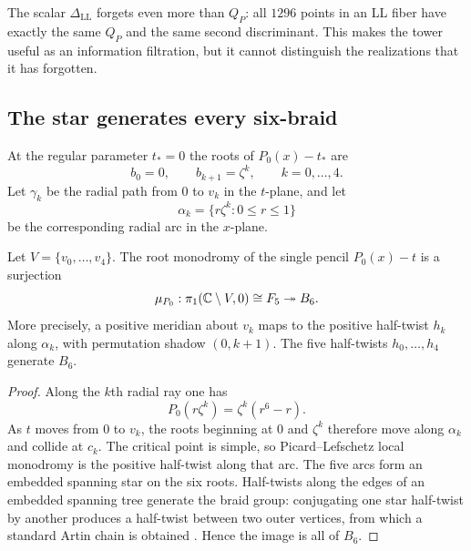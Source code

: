The scalar $\Delta_{\mathrm{LL}}$ forgets even more than $Q_P$: all $1296$
points in an LL fiber have exactly the same $Q_P$ and the same second
discriminant.  This makes the tower useful as an information filtration, but
it cannot distinguish the realizations that it has forgotten.

\subsection{The star generates every six-braid}

At the regular parameter $t_*=0$ the roots of $P_0(x)-t_*$ are
\begin{equation}
 b_0=0,
 \qquad
 b_{k+1}=\zeta^k,
 \qquad k=0,\ldots,4.
 \label{eq:sextic-base-root-labels}
\end{equation}
Let $\gamma_k$ be the radial path from $0$ to $v_k$ in the $t$-plane, and let
\begin{equation}
 \alpha_k=\{r\zeta^k:0\le r\le1\}
 \label{eq:sextic-star-vanishing-arcs}
\end{equation}
be the corresponding radial arc in the $x$-plane.

\begin{theorem}
\label{thm:sextic-full-braid-monodromy}
Let $V=\{v_0,\ldots,v_4\}$.  The root monodromy of the single pencil
$P_0(x)-t$ is a surjection
\begin{equation}
 \mu_{P_0}:\pi_1(\mathbb{C}\setminus V,0)\cong F_5
 \twoheadrightarrow B_6.
 \label{eq:sextic-root-monodromy-surjection}
\end{equation}
More precisely, a positive meridian about $v_k$ maps to the positive
half-twist $h_k$ along $\alpha_k$, with permutation shadow
$(0,k+1)$.  The five half-twists $h_0,\ldots,h_4$ generate $B_6$.
\end{theorem}

\begin{proof}
Along the $k$th radial ray one has
\begin{equation}
 P_0(r\zeta^k)=\zeta^k(r^6-r).
 \label{eq:sextic-radial-restriction}
\end{equation}
As $t$ moves from $0$ to $v_k$, the roots beginning at $0$ and $\zeta^k$
therefore move along $\alpha_k$ and collide at $c_k$.  The critical point is
simple, so Picard--Lefschetz local monodromy is the positive half-twist along
that arc.  The five arcs form an embedded spanning star on the six roots.
Half-twists along the edges of an embedded spanning tree generate the braid
group: conjugating one star half-twist by another produces a half-twist between
two outer vertices, from which a standard Artin chain is obtained
\cite[Chapter~1]{Birman1974Braids}.  Hence the image is all of $B_6$.
\end{proof}

